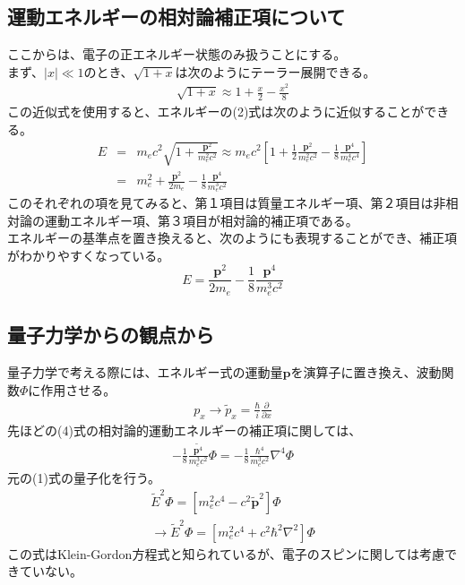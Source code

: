 \documentclass[10pt]{jreport}
\begin{document}
\subsection*{運動エネルギーの相対論補正項について}
ここからは、電子の正エネルギー状態のみ扱うことにする。\\
まず、$|x|\ll1$のとき、$\sqrt{1+x}$は次のようにテーラー展開できる。\\
\begin{eqnarray}
\sqrt{1+x} \approx 1+\frac{x}{2}-\frac{x^2}{8} \nonumber
\end{eqnarray}
この近似式を使用すると、エネルギーの(2)式は次のように近似することができる。\\
\begin{eqnarray}
E &=& m_ec^2\sqrt{1+\frac{\textbf{p}^2}{m_e^2c^2}}\approx m_ec^2[1+\frac{1}{2}\frac{\textbf{p}^2}{m_e^2c^2}-\frac{1}{8}\frac{\textbf{p}^4}{m_e^4c^4}] \nonumber \\
&=& m_e^2 + \frac{\textbf{p}^2}{2m_e}-\frac{1}{8}\frac{\textbf{p}^4}{m_e^3 c^2} 
\end{eqnarray}
このそれぞれの項を見てみると、第１項目は質量エネルギー項、第２項目は非相対論の運動エネルギー項、第３項目が相対論的補正項である。\\
エネルギーの基準点を置き換えると、次のようにも表現することができ、補正項がわかりやすくなっている。
\begin{equation}
E=\frac{\textbf{p}^2}{2m_e}-\frac{1}{8}\frac{\textbf{p}^4}{m_e^3c^2}
\end{equation}

\subsection*{量子力学からの観点から}
量子力学で考える際には、エネルギー式の運動量$\textbf{p}$を演算子に置き換え、波動関数$\Phi$に作用させる。
\begin{eqnarray}
p_x \rightarrow \tilde{p}_x = \frac{\hbar}{i} \frac{\partial}{\partial x} \nonumber 
\end{eqnarray}
先ほどの(4)式の相対論的運動エネルギーの補正項に関しては、
\begin{eqnarray}
-\frac{1}{8}\frac{\tilde{\textbf{p}^4}}{m_e^3c^2}\Phi = -\frac{1}{8} \frac{\hbar ^4}{m_e^3 c^2}\nabla^4\Phi 
\end{eqnarray}
元の(1)式の量子化を行う。
\begin{eqnarray}
\tilde{E}^2 \Phi = [m_e^2c^4-c^2\tilde{\textbf{p}}^2]\Phi \nonumber \\
\rightarrow \tilde{E}^2 \Phi = [m_e^2 c^4+c^2\hbar ^2 \nabla^2]\Phi
\end{eqnarray}
この式はKlein-Gordon方程式と知られているが、電子のスピンに関しては考慮できていない。
\end{document}
